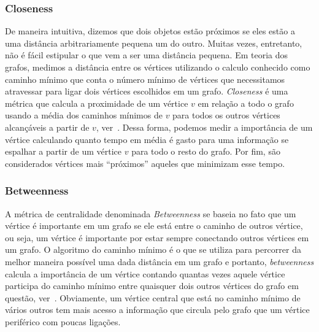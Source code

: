 \subsubsection{Closeness}
\label{subsubsection::closeness}

De maneira intuitiva, dizemos que dois objetos estão próximos se eles estão a uma distância arbitrariamente pequena um do outro. Muitas vezes, entretanto, não é fácil estipular o que vem a ser uma distância pequena. Em teoria dos grafos, medimos a distância entre os vértices utilizando o calculo conhecido como caminho mínimo que conta o número mínimo de vértices que necessitamos atravessar para ligar dois vértices escolhidos em um grafo. \textit{Closeness} é uma métrica que calcula a proximidade de um vértice $v$ em relação a todo o grafo usando a média dos caminhos mínimos de $v$ para todos os outros vértices alcançáveis a partir de $v$, ver~\cite{Beauchamp65}. Dessa forma, podemos medir a importância de um vértice calculando quanto tempo em média é gasto para uma informação se espalhar a partir de um vértice $v$ para todo o resto do grafo. Por fim, são considerados vértices mais ``próximos'' aqueles que minimizam esse tempo.

\subsubsection{Betweenness}
\label{subsubsection::constraint}
A métrica de centralidade denominada \textit{Betweenness} se baseia no fato que um vértice é importante em um grafo se ele está entre o caminho de outros vértice, ou seja, um vértice é importante por estar sempre conectando outros vértices em um grafo. O algoritmo do caminho mínimo é o que se utiliza para percorrer da melhor maneira possível uma dada distância em um grafo e portanto, \textit{betweenness} calcula a importância de um vértice contando quantas vezes aquele vértice participa do caminho mínimo entre quaisquer dois outros vértices do grafo em questão, ver~\cite{Sabidussi66}. Obviamente, um vértice central que está no caminho mínimo de vários outros tem mais acesso a informação que circula pelo grafo que um vértice periférico com poucas ligações.

